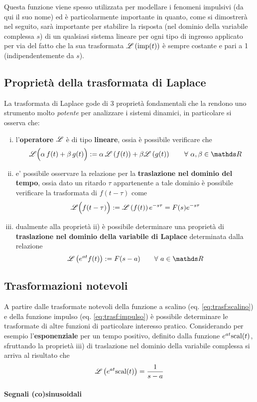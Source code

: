 	Questa funzione viene spesso utilizzata per modellare i fenomeni impulsivi (da qui il suo nome) ed è particolarmente importante in quanto, come si dimostrerà nel seguito, sarà importante per stabilire la risposta (nel dominio della variabile complessa $s$) di un qualsiasi sistema lineare per ogni tipo di ingresso applicato per via del fatto che la sua trasformata $\mathscr L \left( \textrm{imp}(t) \right)$ è sempre costante e pari a 1 (indipendentemente da $s$).
	
	
	\subsection{Proprietà della trasformata di Laplace}
	    La trasformata di Laplace gode di 3 proprietà fondamentali che la rendono uno strumento molto \textit{potente} per analizzare i sistemi dinamici, in particolare si osserva che:
	    \begin{enumerate}[i)]
	        \item l'\textbf{operatore} $\mathscr L$ è di tipo \textbf{lineare}, ossia è possibile verificare che
	        \begin{equation}
	            \L\Big( \alpha\, f(t) + \beta\, g(t)\Big) := \alpha\, \trasf{f(t)} + \beta \trasf{g(t)} \qquad \forall \ \alpha,\beta\in\mathds R 
	        \end{equation}
	        
	        \item e' possibile osservare la relazione per la \textbf{traslazione nel dominio del tempo}, ossia dato un ritardo $\tau$ appartenente a tale dominio è possibile verificare la trasformata di $f(t-\tau)$ come
	        \begin{equation}
	            \mathscr L \Big( f(t-\tau)\Big) := \mathscr L \left( f(t) \right) e^{-s\tau} = F(s) e^{-s\tau} 
	        \end{equation}
	        
	        \item dualmente alla proprietà ii) è possibile determinare una proprietà di \textbf{traslazione nel dominio della variabile di Laplace} determinata dalla relazione
	        \begin{equation}
	            \trasf{e^{at} f(t) } := F(s-a) \qquad \forall \ a \in \mathds R
	        \end{equation}
	        
	    \end{enumerate}
	
	\subsection{Trasformazioni notevoli}
	    A partire dalle trasformate notevoli della funzione a scalino (eq. \ref{eq:trasf:scalino}) e della funzione impulso (eq. \ref{eq:trasf:impulso}) è possibile determinare le trasformate di altre funzioni di particolare interesso pratico. Considerando per esempio l'\textbf{esponenziale} per un tempo positivo, definito dalla funzione $e^{at}\textrm{scal}(t)$, sfruttando la proprietà iii) di traslazione nel dominio della variabile complessa si arriva al risultato che
	    \begin{equation}
	        \mathscr L \left( e^{at} \textrm{scal}(t) \right) = \frac 1 {s-a}
	    \end{equation}
	    
	    \paragraph{Segnali (co)sinusoidali}